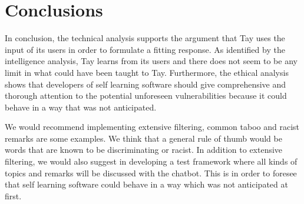 \chapter{Conclusions}
In conclusion, the technical analysis supports the argument that Tay uses the input of its users in order to formulate a fitting response. As identified by the intelligence analysis, Tay learns from its users and there does not seem to be any limit in what could have been taught to Tay. Furthermore, the ethical analysis shows that developers of self learning software should give comprehensive and thorough attention to the potential unforeseen vulnerabilities because it could behave in a way that was not anticipated.

We would recommend implementing extensive filtering, common taboo and racist remarks are some examples. We think that a general rule of thumb would be words that are known to be discriminating or racist. In addition to extensive filtering, we would also suggest in developing a test framework where all kinds of topics and remarks will be discussed with the chatbot. This is in order to foresee that self learning software could behave in a way which was not anticipated at first.
